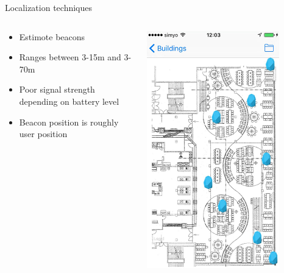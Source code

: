 \documentclass[11pt]{beamer}
\begin{document}
\begin{frame}[t]{Localization techniques}
  \begin{columns}[t]
    \begin{column}[b]{0.7\textwidth}
      \begin{itemize}
        \setlength{\itemsep}{1pt}
        \setlength{\parskip}{0pt}
        \setlength{\parsep}{0pt}
        \item Estimote beacons
        \item Ranges between 3-15m and 3-70m
        \item Poor signal strength depending on battery level
        \item Beacon position is roughly user position
      \end{itemize}
    \end{column}
    \hfill
    \begin{column}{0.3\textwidth}
      \includegraphics[width=0.8\textwidth]{beaconsonthemapwithoutborder}%
    \end{column}
  \end{columns}

\end{frame}
\end{document}
